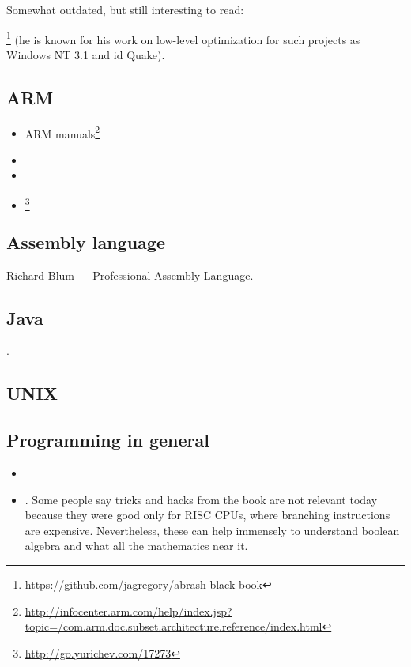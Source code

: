 Somewhat outdated, but still interesting to read:

\MAbrash\footnote{\AlsoAvailableAs \url{https://github.com/jagregory/abrash-black-book}}
(he is known for his work on low-level optimization for such projects as Windows NT 3.1 and id Quake).

\subsection{ARM}

\begin{itemize}
\item ARM manuals\footnote{\AlsoAvailableAs \url{http://infocenter.arm.com/help/index.jsp?topic=/com.arm.doc.subset.architecture.reference/index.html}}

\item \ARMSevenRef

\item \ARMSixFourRefURL

\item \ARMCookBook\footnote{\AlsoAvailableAs \url{http://go.yurichev.com/17273}}
\end{itemize}

\subsection{Assembly language}

Richard Blum --- Professional Assembly Language.

\subsection{Java}

\JavaBook.

\subsection{UNIX}

\TAOUP

\subsection{Programming in general}

\begin{itemize}

\item \RobPikePractice

\item \HenryWarren.
Some people say tricks and hacks from the book are not relevant today because they were good only for \ac{RISC} \ac{CPU}s,
where branching instructions are expensive.
Nevertheless, these can help immensely to understand boolean algebra and what all the mathematics near it.

\end{itemize}

